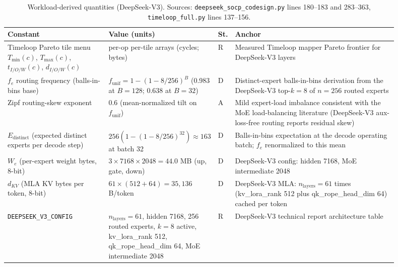 \begin{table}[!htb]
\centering
\caption{Workload-derived quantities (DeepSeek-V3). Sources: \texttt{deepseek\_\allowbreak socp\_\allowbreak codesign.py} lines 180--183 and 283--363, \texttt{timeloop\_\allowbreak full.py} lines 137--156.}
\label{tab:coeff_workload}
\footnotesize\setlength{\tabcolsep}{3pt}
\begin{tabular}{@{}p{0.26\linewidth}p{0.17\linewidth}p{0.045\linewidth}p{0.42\linewidth}@{}}
\toprule
Constant & Value (units) & St. & Anchor \\
\midrule
Timeloop Pareto tile menu $T_{\min}(c)$, $T_{\max}(c)$, $t_{I/O/W}(c)$, $d_{I/O/W}(c)$ & per-op per-tile arrays (cycles; bytes) & R & Measured Timeloop mapper Pareto frontier for DeepSeek-V3 layers \citep{timeloop} \\
$f_e$ routing frequency (balls-in-bins base) & $f_{\mathrm{unif}} = 1-(1-8/256)^{B}$ (0.983 at $B{=}128$; 0.638 at $B{=}32$) & D & Distinct-expert balls-in-bins derivation from the DeepSeek-V3 top-$k{=}8$ of $n{=}256$ routed experts \citep{deepseekv3report} \\
Zipf routing-skew exponent & 0.6 (mean-normalized tilt on $f_{\mathrm{unif}}$) & A & Mild expert-load imbalance consistent with the MoE load-balancing literature (DeepSeek-V3 aux-loss-free routing reports residual skew) \citep{deepseekv3report} \\
$E_{\mathrm{distinct}}$ (expected distinct experts per decode step) & $256(1-(1-8/256)^{32}) \approx 163$ at batch 32 & D & Balls-in-bins expectation at the decode operating batch; $f_e$ renormalized to this mean \citep{deepseekv3report} \\
$W_e$ (per-expert weight bytes, 8-bit) & $3 \times 7168 \times 2048 = 44.0$ MB (up, gate, down) & D & DeepSeek-V3 config: hidden 7168, MoE intermediate 2048 \citep{deepseekv3report} \\
$d_{KV}$ (MLA KV bytes per token, 8-bit) & $61 \times (512+64) = 35{,}136$ B/token & D & DeepSeek-V3 MLA: $n_{\mathrm{layers}} = 61$ times (kv\_\allowbreak lora\_\allowbreak rank 512 plus qk\_\allowbreak rope\_\allowbreak head\_\allowbreak dim 64) cached per token \citep{deepseekv3report} \\
\texttt{DEEPSEEK\_\allowbreak V3\_\allowbreak CONFIG} & $n_{\mathrm{layers}}{=}61$, hidden 7168, 256 routed experts, $k{=}8$ active, kv\_\allowbreak lora\_\allowbreak rank 512, qk\_\allowbreak rope\_\allowbreak head\_\allowbreak dim 64, MoE intermediate 2048 & R & DeepSeek-V3 technical report architecture table \citep{deepseekv3report} \\
\bottomrule
\end{tabular}

\end{table}

